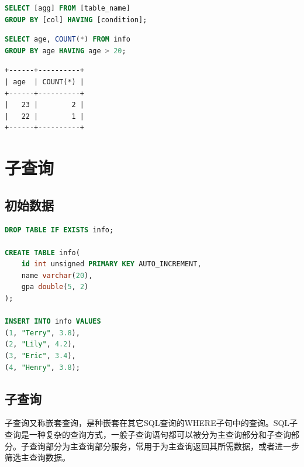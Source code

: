 \documentclass[12pt, openany, oneside]{book}
\begin{document}
\vspace{-0.5cm}

\begin{lstlisting}[language=SQL]
SELECT [agg] FROM [table_name]
GROUP BY [col] HAVING [condition];
\end{lstlisting}

\vspace{0.5cm}


\begin{lstlisting}[language=SQL]
SELECT age, COUNT(*) FROM info
GROUP BY age HAVING age > 20;
\end{lstlisting}

\begin{tcolorbox}
    \begin{verbatim}
+------+----------+
| age  | COUNT(*) |
+------+----------+
|   23 |        2 |
|   22 |        1 |
+------+----------+
	\end{verbatim}
\end{tcolorbox}

\newpage

\chapter{子查询}

\section{初始数据}


\begin{lstlisting}[language=SQL]
DROP TABLE IF EXISTS info;

CREATE TABLE info(
    id int unsigned PRIMARY KEY AUTO_INCREMENT,
    name varchar(20),
    gpa double(5, 2)
);

INSERT INTO info VALUES
(1, "Terry", 3.8),
(2, "Lily", 4.2),
(3, "Eric", 3.4),
(4, "Henry", 3.8);
\end{lstlisting}

\section{子查询}

子查询又称嵌套查询，是种嵌套在其它SQL查询的WHERE子句中的查询。SQL子查询是一种复杂的查询方式，一般子查询语句都可以被分为主查询部分和子查询部分。子查询部分为主查询部分服务，常用于为主查询返回其所需数据，或者进一步筛选主查询数据。 \\
\end{document}
